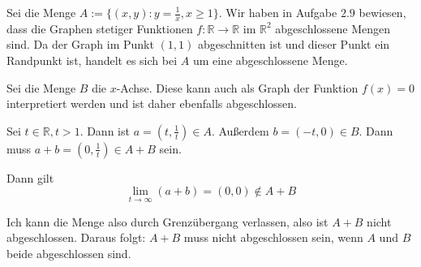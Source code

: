 \documentclass[a4paper,german,12pt,smallheadings]{scrartcl}
\begin{document}
Sei die Menge $A := \{(x,y): y = \frac{1}{x}, x \ge 1\}$. Wir
haben in Aufgabe $2.9$ bewiesen, dass die Graphen stetiger Funktionen $f:
\mathbb{R} \to \mathbb{R}$ im $\mathbb{R}^2$ abgeschlossene Mengen sind. Da der
Graph im Punkt $(1,1)$ abgeschnitten ist und dieser Punkt ein Randpunkt ist,
handelt es sich bei $A$ um eine abgeschlossene Menge.

Sei die Menge $B$ die $x$-Achse. Diese kann auch als Graph der Funktion $f(x) =
0$ interpretiert werden und ist daher ebenfalls abgeschlossen.

Sei $t \in \mathbb{R}, t > 1$. Dann ist $a = (t, \frac{1}{t}) \in A$. Außerdem
$b = (-t, 0) \in B$. Dann muss $a+b = (0, \frac{1}{t}) \in A+B$ sein.

Dann gilt
\begin{equation*}
  \lim_{t \to \infty} (a+b) = (0,0) \notin A+B
\end{equation*}

Ich kann die Menge also durch Grenzübergang verlassen, also ist $A+B$ nicht
abgeschlossen. Daraus folgt: $A + B$ muss nicht abgeschlossen sein, wenn $A$
und $B$ beide abgeschlossen sind.
\end{document}
